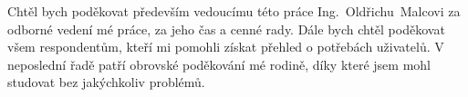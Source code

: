 \documentclass[czech,bachelor,unicode]{template/ctufit-thesis}
\theoremstyle{plain}
\theoremstyle{definition}
\theoremstyle{remark}
\numberwithin{theorem}{chapter}
\begin{document}
\frontmatter\frontmatterinit %


\thispagestyle{empty}\cleardoublepage\maketitle %

\imprintpage %

\tableofcontents %
\listoffigures %
\begingroup
\let\clearpage\relax
\listoftables %
\listoflistings %
\endgroup

\begin{acknowledgmentpage}
	Chtěl bych poděkovat především vedoucímu této práce Ing.~Oldřichu~Malcovi za odborné vedení mé práce, za jeho čas a cenné rady.
    Dále bych chtěl poděkovat všem respondentům, kteří mi pomohli získat přehled o potřebách uživatelů. V neposlední řadě patří obrovské
    poděkování mé rodině, díky které jsem mohl studovat bez jakýchkoliv problémů.
\end{acknowledgmentpage}
\end{document}
